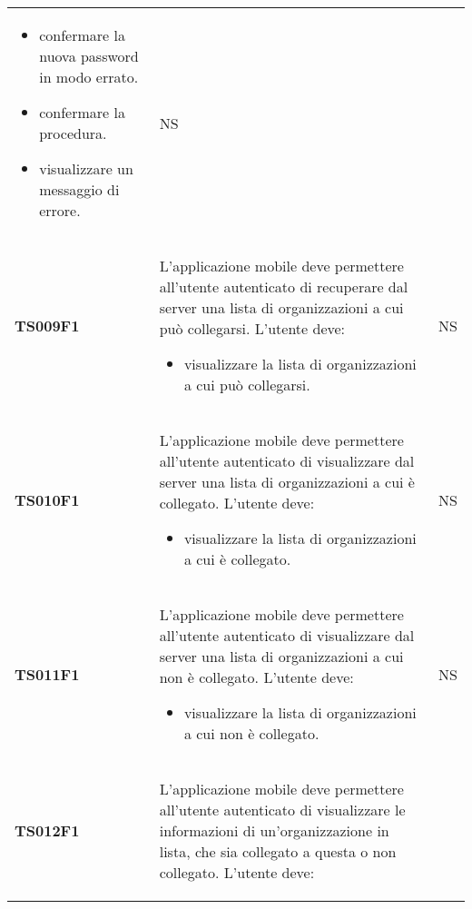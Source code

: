 \documentclass[../piano-di-qualifica.tex]{subfiles}
\begin{document}
\begin{centering}
\begin{longtable}[H]{>{\centering\bfseries}m{3cm} >{}p{10cm} >{\centering\arraybackslash}m{3cm}}
\begin{itemize}
                        \item confermare la nuova password in modo errato.
                        \item confermare la procedura.
                        \item visualizzare un messaggio di errore.
                      \end{itemize}
                    & NS \\
        TS009F1     & L'applicazione mobile deve permettere all'utente autenticato di recuperare dal server una lista di organizzazioni a cui può collegarsi. \newline
                      L'utente deve:
                      \begin{itemize}
                        \item visualizzare la lista di organizzazioni a cui può collegarsi.
                      \end{itemize}
                    & NS \\
        TS010F1     & L'applicazione mobile deve permettere all'utente autenticato di visualizzare dal server una lista di organizzazioni a cui è collegato. \newline
                      L'utente deve:
                      \begin{itemize}
                        \item visualizzare la lista di organizzazioni a cui è collegato.
                      \end{itemize}
                    & NS \\
        TS011F1     & L'applicazione mobile deve permettere all'utente autenticato di visualizzare dal server una lista di organizzazioni a cui non è collegato. \newline
                      L'utente deve:
                      \begin{itemize}
                        \item visualizzare la lista di organizzazioni a cui non è collegato.
                      \end{itemize}
                    & NS \\
        TS012F1     & L'applicazione mobile deve permettere all'utente autenticato di visualizzare le informazioni di un'organizzazione in lista, che sia collegato a questa o non collegato. \newline
                      L'utente deve:
                      \begin{itemize}

\end{itemize}
\end{longtable}
\end{centering}
\end{document}

